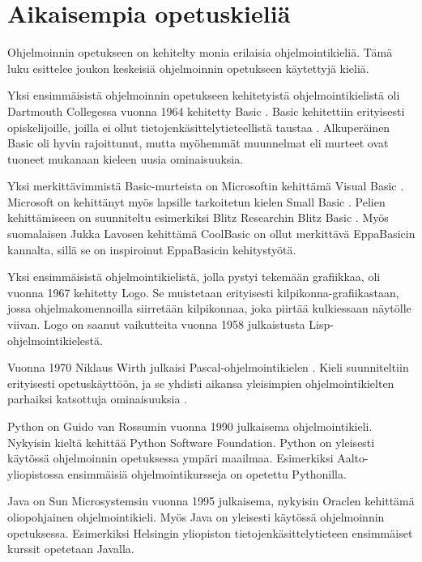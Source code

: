 
\section{Aikaisempia opetuskieliä}
Ohjelmoinnin opetukseen on kehitelty
monia erilaisia ohjelmointikieliä.
Tämä luku esittelee joukon
keskeisiä ohjelmoinnin opetukseen
käytettyjä kieliä.

Yksi ensimmäisistä ohjelmoinnin
opetukseen kehitetyistä
ohjelmointikielistä oli
Dartmouth Collegessa vuonna 1964
kehitetty Basic \cite{basic}.
Basic kehitettiin erityisesti
opiskelijoille, joilla ei ollut
tietojenkäsittelytieteellistä
taustaa \cite{language_history}.
Alkuperäinen Basic oli hyvin
rajoittunut, mutta myöhemmät muunnelmat
eli murteet ovat tuoneet mukanaan
kieleen uusia ominaisuuksia.

Yksi merkittävimmistä
Basic-murteista on
Microsoftin kehittämä
Visual Basic \cite{vb.net}.
Microsoft on kehittänyt myös
lapsille tarkoitetun kielen
Small Basic \cite{sb}.
Pelien kehittämiseen on suunniteltu
esimerkiksi Blitz Researchin
Blitz Basic \cite{bb}.
Myös suomalaisen
Jukka Lavosen kehittämä
CoolBasic \cite{cb} on ollut merkittävä
EppaBasicin kannalta, sillä
se on inspiroinut EppaBasicin
kehitystyötä.

Yksi ensimmäisistä ohjelmointikielistä,
jolla pystyi tekemään grafiikkaa,
oli vuonna 1967 kehitetty Logo.
Se muistetaan erityisesti
kilpikonna-grafiikastaan,
jossa ohjelmakomennoilla
siirretään kilpikonnaa,
joka piirtää kulkiessaan
näytölle viivan.
Logo on saanut vaikutteita vuonna 1958
julkaistusta Lisp-ohjelmointikielestä.

Vuonna 1970 Niklaus Wirth
julkaisi Pascal-ohjelmointikielen
\cite{pascal}.
Kieli suunniteltiin erityisesti
opetuskäyttöön, ja se yhdisti
aikansa yleisimpien ohjelmointikielten
parhaiksi katsottuja ominaisuuksia
\cite{language_history}.

Python \cite{python} on
Guido van Rossumin vuonna 1990
julkaisema ohjelmointikieli.
Nykyisin kieltä kehittää
Python Software Foundation.
Python on yleisesti käytössä ohjelmoinnin
opetuksessa ympäri maailmaa.
Esimerkiksi Aalto-yliopistossa
ensimmäisiä ohjelmointikursseja
on opetettu Pythonilla.

Java \cite{java} on Sun Microsystemsin
vuonna 1995 julkaisema,
nykyisin Oraclen kehittämä
oliopohjainen ohjelmointikieli.
Myös Java on yleisesti käytössä
ohjelmoinnin opetuksessa.
Esimerkiksi Helsingin yliopiston
tietojenkäsittelytieteen ensimmäiset
kurssit opetetaan Javalla.

